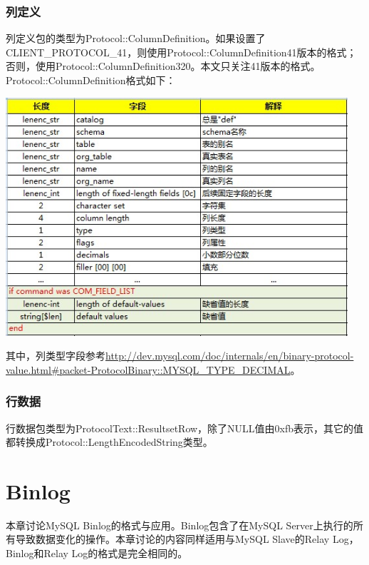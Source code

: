 \documentclass[a4paper, titlepage, 10pt, bookmark]{article}
\begin{document}
\subsubsection{列定义}
列定义包的类型为Protocol::ColumnDefinition。如果设置了CLIENT\_PROTOCOL\_41，则使用Protocol::ColumnDefinition41版本的格式；否则，使用Protocol::ColumnDefinition320。本文只关注41版本的格式。\\

Protocol::ColumnDefinition格式如下：
\begin{center}
\includegraphics[width=5in]{015.jpg}
\end{center}

其中，列类型字段参考\url{http://dev.mysql.com/doc/internals/en/binary-protocol-value.html#packet-ProtocolBinary::MYSQL_TYPE_DECIMAL}。

\subsubsection{行数据}
行数据包类型为ProtocolText::ResultsetRow，除了NULL值由0xfb表示，其它的值都转换成Protocol::LengthEncodedString类型。

\newpage









\section{Binlog}
本章讨论MySQL Binlog的格式与应用。Binlog包含了在MySQL Server上执行的所有导致数据变化的操作。本章讨论的内容同样适用与MySQL Slave的Relay Log，Binlog和Relay Log的格式是完全相同的。
\end{document}
